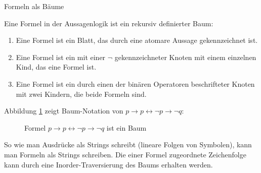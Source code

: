 \begin{defi}Formeln als Bäume\label{Definition 2.2}\cite{Ben-Ari} \end{defi}Eine Formel in der Aussagenlogik ist ein rekursiv definierter Baum:
\begin{enumerate}
\item Eine Formel ist ein Blatt, das durch eine atomare Aussage gekennzeichnet ist.
\item Eine Formel ist ein mit einer $\neg$ gekennzeichneter Knoten mit einem einzelnen Kind, das eine Formel ist.
\item Eine Formel ist ein durch einen der binären Operatoren beschrifteter Knoten mit zwei Kindern, die beide Formeln sind.
\end{enumerate}
Abbildung \ref{Abb. 2.1} zeigt Baum-Notation von $p \rightarrow p \leftrightarrow \neg p \rightarrow \neg q $:
\begin {figure}[h]
\begin{center}
\end{center}
\caption[Beispiel Konstruktion für eine Formel]{Formel $p \rightarrow p \leftrightarrow \neg p \rightarrow \neg q $ ist ein Baum}	
\label{Abb. 2.1}
\end{figure}

\begin{bem}\label{FormelAlsString}\end{bem}
So wie man Ausdrücke als Strings schreibt (lineare Folgen von Symbolen), kann man Formeln als Strings schreiben. Die einer Formel zugeordnete Zeichenfolge kann durch eine Inorder-Traversierung des Baums erhalten werden.



